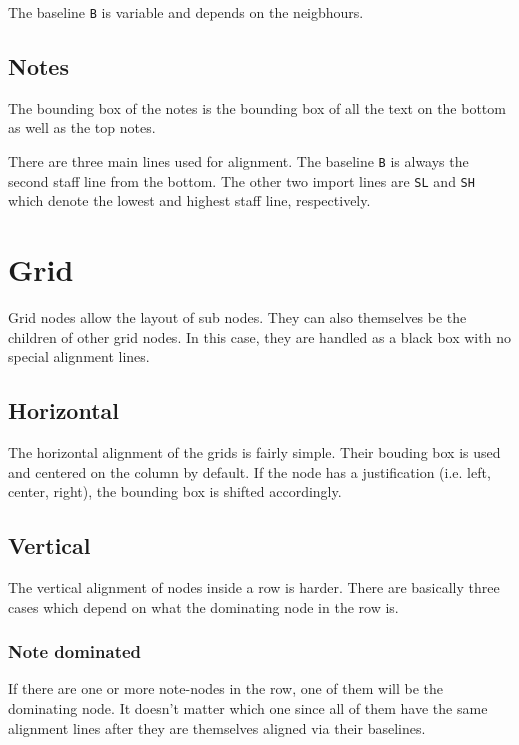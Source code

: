 \documentclass[a4paper]{article}
\begin{document}
The baseline \texttt{B} is variable and depends on the neigbhours.

\subsection{Notes}



The bounding box of the notes is the bounding box of all the text on the bottom as
well as the top notes.

There are three main lines used for alignment. The baseline \texttt{B} is always
the second staff line from the bottom. The other two import lines are \texttt{SL}
and \texttt{SH} which denote the lowest and highest staff line, respectively.

\section{Grid}

Grid nodes allow the layout of sub nodes. They can also themselves be the children of
other grid nodes. In this case, they are handled as a black box with no special
alignment lines.

\subsection{Horizontal}

The horizontal alignment of the grids is fairly simple. Their bouding box is used
and centered on the column by default. If the node has a justification (i.e. left,
center, right), the bounding box is shifted accordingly.

\subsection{Vertical}

The vertical alignment of nodes inside a row is harder. There are basically three cases
which depend on what the dominating node in the row is.

\subsubsection{Note dominated}

If there are one or more note-nodes in the row, one of them will be the
dominating node. It doesn't matter which one since all of them have the same
alignment lines after they are themselves aligned via their baselines.
\end{document}
